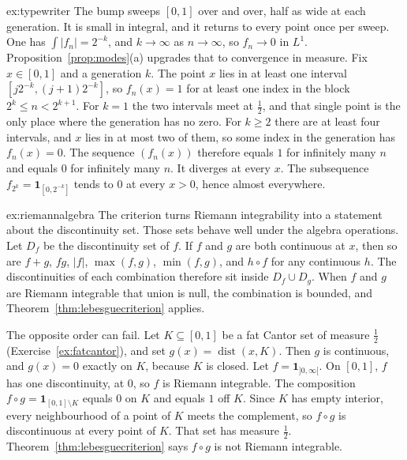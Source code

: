 \begin{solution}{ex:typewriter}
\idea The bump sweeps \([0,1]\) over and over, half as wide at each generation. It is small in integral, and it returns to every point once per sweep.
\writeup One has \(\int|f_n|=2^{-k}\), and \(k\to\infty\) as \(n\to\infty\), so \(f_n\to0\) in \(L^1\). Proposition~\ref{prop:modes}(a) upgrades that to convergence in measure. Fix \(x\in[0,1]\) and a generation \(k\). The point \(x\) lies in at least one interval \([j2^{-k},(j+1)2^{-k}]\), so \(f_n(x)=1\) for at least one index in the block \(2^k\le n<2^{k+1}\). For \(k=1\) the two intervals meet at \(\frac12\), and that single point is the only place where the generation has no zero. For \(k\ge2\) there are at least four intervals, and \(x\) lies in at most two of them, so some index in the generation has \(f_n(x)=0\). The sequence \((f_n(x))\) therefore equals \(1\) for infinitely many \(n\) and equals \(0\) for infinitely many \(n\). It diverges at every \(x\). The subsequence \(f_{2^k}=\mathbf 1_{[0,2^{-k}]}\) tends to \(0\) at every \(x>0\), hence almost everywhere.
\end{solution}

\begin{solution}{ex:riemannalgebra}
\idea The criterion turns Riemann integrability into a statement about the discontinuity set. Those sets behave well under the algebra operations.
\writeup Let \(D_f\) be the discontinuity set of \(f\). If \(f\) and \(g\) are both continuous at \(x\), then so are \(f+g\), \(fg\), \(|f|\), \(\max(f,g)\), \(\min(f,g)\), and \(h\circ f\) for any continuous \(h\). The discontinuities of each combination therefore sit inside \(D_f\cup D_g\). When \(f\) and \(g\) are Riemann integrable that union is null, the combination is bounded, and Theorem~\ref{thm:lebesguecriterion} applies.

The opposite order can fail. Let \(K\subseteq[0,1]\) be a fat Cantor set of measure \(\frac12\) (Exercise~\ref{ex:fatcantor}), and set \(g(x)=\operatorname{dist}(x,K)\). Then \(g\) is continuous, and \(g(x)=0\) exactly on \(K\), because \(K\) is closed. Let \(f=\mathbf 1_{]0,\infty[}\). On \([0,1]\), \(f\) has one discontinuity, at \(0\), so \(f\) is Riemann integrable. The composition \(f\circ g=\mathbf 1_{[0,1]\setminus K}\) equals \(0\) on \(K\) and equals \(1\) off \(K\). Since \(K\) has empty interior, every neighbourhood of a point of \(K\) meets the complement, so \(f\circ g\) is discontinuous at every point of \(K\). That set has measure \(\frac12\). Theorem~\ref{thm:lebesguecriterion} says \(f\circ g\) is not Riemann integrable.
\end{solution}

